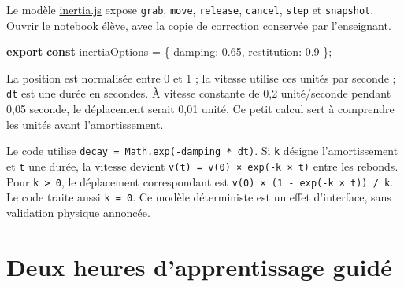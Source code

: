 \documentclass[
  canadien,
  11pt,
  a4paper,
]{report}
\newenvironment{Shaded}{}{}
\newcommand{\DataTypeTok}[1]{\textcolor[rgb]{0.56,0.13,0.00}{#1}}
\newcommand{\FloatTok}[1]{\textcolor[rgb]{0.25,0.63,0.44}{#1}}
\newcommand{\ImportTok}[1]{\textcolor[rgb]{0.00,0.50,0.00}{\textbf{#1}}}
\newcommand{\KeywordTok}[1]{\textcolor[rgb]{0.00,0.44,0.13}{\textbf{#1}}}
\newcommand{\NormalTok}[1]{#1}
\newcommand{\OperatorTok}[1]{\textcolor[rgb]{0.40,0.40,0.40}{#1}}
\begin{document}
Le modèle \href{../../frontend/module-4/inertia.js}{inertia.js} expose
\texttt{grab}, \texttt{move}, \texttt{release}, \texttt{cancel},
\texttt{step} et \texttt{snapshot}. Ouvrir le
\href{../../notebooks/module-4.ipynb}{notebook élève}, avec la copie de
correction conservée par l'enseignant.

\begin{Shaded}
\begin{Highlighting}[]
\ImportTok{export} \KeywordTok{const}\NormalTok{ inertiaOptions }\OperatorTok{=}\NormalTok{ \{ }\DataTypeTok{damping}\OperatorTok{:} \FloatTok{0.65}\OperatorTok{,} \DataTypeTok{restitution}\OperatorTok{:} \FloatTok{0.9}\NormalTok{ \}}\OperatorTok{;}
\end{Highlighting}
\end{Shaded}

La position est normalisée entre 0 et 1 ; la vitesse utilise ces unités
par seconde ; \texttt{dt} est une durée en secondes. À vitesse constante
de 0,2 unité/seconde pendant 0,05 seconde, le déplacement serait 0,01
unité. Ce petit calcul sert à comprendre les unités avant
l'amortissement.

Le code utilise \texttt{decay\ =\ Math.exp(-damping\ *\ dt)}. Si
\texttt{k} désigne l'amortissement et \texttt{t} une durée, la vitesse
devient \texttt{v(t)\ =\ v(0)\ ×\ exp(-k\ ×\ t)} entre les rebonds. Pour
\texttt{k\ \textgreater{}\ 0}, le déplacement correspondant est
\texttt{v(0)\ ×\ (1\ -\ exp(-k\ ×\ t))\ /\allowbreak{}\ k}. Le code traite aussi
\texttt{k\ =\ 0}. Ce modèle déterministe est un effet d'interface, sans
validation physique annoncée.

\section{Deux heures d'apprentissage
guidé}\label{deux-heures-dapprentissage-guiduxe9-3}
\end{document}
